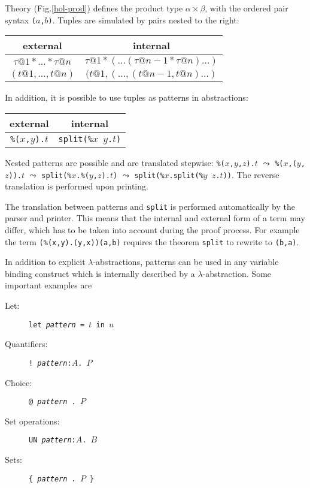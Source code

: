 Theory  (Fig.\ts\ref{hol-prod}) defines the product type
$\alpha\times\beta$, with the ordered pair syntax {\tt($a$,$b$)}. Tuples are
simulated by pairs nested to the right:
\begin{center}
\begin{tabular}{|c|c|}
\hline
external & internal \\
\hline
$\tau@1 * \dots * \tau@n$ & $\tau@1 * (\dots (\tau@{n-1} * \tau@n)\dots)$ \\
\hline
$(t@1,\dots,t@n)$ & $(t@1,(\dots,(t@{n-1},t@n)\dots)$ \\
\hline
\end{tabular}
\end{center}
In addition, it is possible to use tuples
as patterns in abstractions:
\begin{center}
\begin{tabular}{|c|c|}
\hline
external & internal \\
\hline
{\tt\%($x$,$y$).$t$} & {\tt split(\%$x$ $y$.$t$)} \\
\hline
\end{tabular}
\end{center}
Nested patterns are possible and are translated stepwise:
{\tt\%($x$,$y$,$z$).$t$} $\leadsto$ {\tt\%($x$,($y$,$z$)).$t$} $\leadsto$
{\tt split(\%$x$.\%($y$,$z$).$t$)} $\leadsto$ {\tt split(\%$x$.split(\%$y$
  $z$.$t$))}. The reverse translation is performed upon printing.
\begin{warn}
  The translation between patterns and {\tt split} is performed automatically
  by the parser and printer. This means that the internal and external form
  of a term may differ, which has to be taken into account during the proof
  process. For example the term {\tt (\%(x,y).(y,x))(a,b)} requires the
  theorem {\tt split} to rewrite to {\tt(b,a)}.
\end{warn}
In addition to explicit $\lambda$-abstractions, patterns can be used in any
variable binding construct which is internally described by a
$\lambda$-abstraction. Some important examples are
\begin{description}
\item[Let:] {\tt let {\it pattern} = $t$ in $u$}
\item[Quantifiers:] {\tt !~{\it pattern}:$A$.~$P$}
\item[Choice:] {\underscoreon \tt @~{\it pattern}~.~$P$}
\item[Set operations:] {\tt UN~{\it pattern}:$A$.~$B$}
\item[Sets:] {\tt \{~{\it pattern}~.~$P$~\}}
\end{description}

